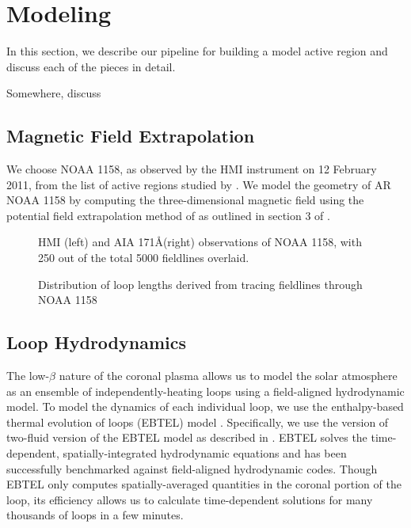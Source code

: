 \section{Modeling}\label{modeling}
In this section, we describe our pipeline for building a model active region and discuss each of the pieces in detail.

Somewhere, discuss 

\subsection{Magnetic Field Extrapolation}\label{field}

We choose \AR NOAA 1158, as observed by the HMI instrument \citet{hoeksema_helioseismic_2014} on 12 February 2011, from the list of active regions studied by \citet{warren_systematic_2012}. We model the geometry of AR NOAA 1158 by computing the three-dimensional magnetic field using the potential field extrapolation method of \citet{schmidt_observable_1964} as outlined in section 3 of \citet{sakurai_greens_1982}. 

\begin{figure*}
    \caption{HMI (left) and AIA 171\AA (right) observations of \AR NOAA 1158, with 250 out of the total 5000 fieldlines overlaid.}
    \label{fig:magnetogram}
\end{figure*}

\begin{figure}
    \caption{Distribution of loop lengths derived from tracing fieldlines through NOAA 1158}
    \label{fig:loops}
\end{figure}

\subsection{Loop Hydrodynamics}\label{loops}
The low-$\beta$ nature of the coronal plasma allows us to model the solar atmosphere as an ensemble of independently-heating loops using a field-aligned hydrodynamic model. To model the dynamics of each individual loop, we use the enthalpy-based thermal evolution of loops (EBTEL) model \citep{klimchuk_highly_2008,cargill_enthalpy-based_2012}. Specifically, we use the version of two-fluid version of the EBTEL model as described in \citep{barnes_inference_2016}. EBTEL solves the time-dependent, spatially-integrated hydrodynamic equations and has been successfully benchmarked against field-aligned hydrodynamic codes. Though EBTEL only computes spatially-averaged quantities in the coronal portion of the loop, its efficiency allows us to calculate time-dependent solutions for many thousands of loops in a few minutes.

